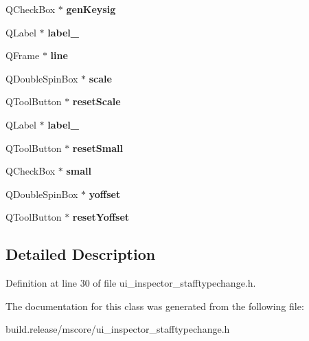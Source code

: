 \begin{DoxyCompactItemize}
Q\+Check\+Box $\ast$ {\bfseries gen\+Keysig}
\item 
\mbox{\label{class_ui___inspector_staff_type_change_a7894799267d0532af104b26c73234406}} 
Q\+Label $\ast$ {\bfseries label\+\_}
\item 
\mbox{\label{class_ui___inspector_staff_type_change_ac677c5bd84b87f6b99d76f3f97af188a}} 
Q\+Frame $\ast$ {\bfseries line}
\item 
\mbox{\label{class_ui___inspector_staff_type_change_ad9c40946390f507a4fe53c8844fbe951}} 
Q\+Double\+Spin\+Box $\ast$ {\bfseries scale}
\item 
\mbox{\label{class_ui___inspector_staff_type_change_a43fdf1a17ffda27a9bcb820ec0bf38e6}} 
Q\+Tool\+Button $\ast$ {\bfseries reset\+Scale}
\item 
\mbox{\label{class_ui___inspector_staff_type_change_a2232a535b6d27ddd19200d7545d1c2cd}} 
Q\+Label $\ast$ {\bfseries label\+\_}
\item 
\mbox{\label{class_ui___inspector_staff_type_change_a31d0d94b3b87b0fa7ba42bc95aea6978}} 
Q\+Tool\+Button $\ast$ {\bfseries reset\+Small}
\item 
\mbox{\label{class_ui___inspector_staff_type_change_a7444c80a581b35bd9e7c1a757723c65c}} 
Q\+Check\+Box $\ast$ {\bfseries small}
\item 
\mbox{\label{class_ui___inspector_staff_type_change_a349a888ae3dec9f325e13a9774f6f6b6}} 
Q\+Double\+Spin\+Box $\ast$ {\bfseries yoffset}
\item 
\mbox{\label{class_ui___inspector_staff_type_change_ac76f2479cabb031e90403802fb26fd9d}} 
Q\+Tool\+Button $\ast$ {\bfseries reset\+Yoffset}
\end{DoxyCompactItemize}


\subsection{Detailed Description}


Definition at line 30 of file ui\+\_\+inspector\+\_\+stafftypechange.\+h.



The documentation for this class was generated from the following file\+:\begin{DoxyCompactItemize}
\item 
build.\+release/mscore/ui\+\_\+inspector\+\_\+stafftypechange.\+h\end{DoxyCompactItemize}
